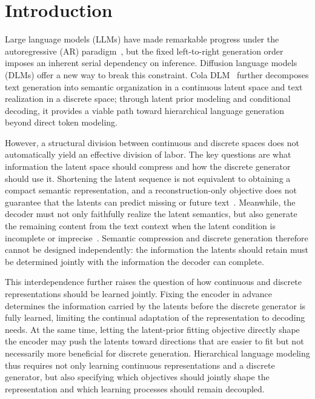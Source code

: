 \section{Introduction}
\label{sec:intro}

Large language models (LLMs) have made remarkable progress under the autoregressive (AR) paradigm~\citep{brown2020language,touvron2023llama}, but the fixed left-to-right generation order imposes an inherent serial dependency on inference. Diffusion language models (DLMs) \citep{austin2021structured,sahoo2024simple,nie2026large,arriola2025block} offer a new way to break this constraint. Cola DLM~\citep{guo2026continuous} further decomposes text generation into semantic organization in a continuous latent space and text realization in a discrete space; through latent prior modeling and conditional decoding, it provides a viable path toward hierarchical language generation beyond direct token modeling.

However, a structural division between continuous and discrete spaces does not automatically yield an effective division of labor. The key questions are what information the latent space should compress and how the discrete generator should use it. Shortening the latent sequence is not equivalent to obtaining a compact semantic representation, and a reconstruction-only objective does not guarantee that the latents can predict missing or future text~\citep{meshchaninov2026cosmos,jiang2026textldm,liang2026aurora}. Meanwhile, the decoder must not only faithfully realize the latent semantics, but also generate the remaining content from the text context when the latent condition is incomplete or imprecise~\citep{uziel2026crocodil}. Semantic compression and discrete generation therefore cannot be designed independently: the information the latents should retain must be determined jointly with the information the decoder can complete.

This interdependence further raises the question of how continuous and discrete representations should be learned jointly. Fixing the encoder in advance determines the information carried by the latents before the discrete generator is fully learned, limiting the continual adaptation of the representation to decoding needs. At the same time, letting the latent-prior fitting objective directly shape the encoder may push the latents toward directions that are easier to fit but not necessarily more beneficial for discrete generation. Hierarchical language modeling thus requires not only learning continuous representations and a discrete generator, but also specifying which objectives should jointly shape the representation and which learning processes should remain decoupled.

